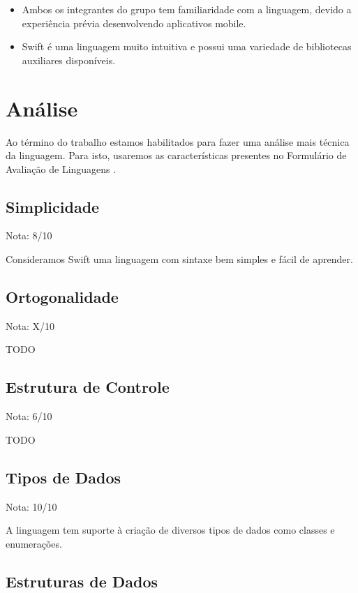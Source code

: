 \documentclass[rel_mlp]{iiufrgs}
\begin{document}
\begin{itemize}[leftmargin=3em]
\setlength{\itemindent}{1em}

    \item Ambos os integrantes do grupo tem familiaridade com a linguagem, devido a experiência prévia desenvolvendo aplicativos mobile.

    \item Swift é uma linguagem muito intuitiva e possui uma variedade de bibliotecas auxiliares disponíveis.

\end{itemize}

\section{Análise}

Ao término do trabalho estamos habilitados para fazer uma análise mais técnica da linguagem. Para isto, usaremos as características presentes no Formulário de Avaliação de Linguagens \cite{catp_01}.

\subsection{Simplicidade}

Nota: 8/10

Consideramos Swift uma linguagem com sintaxe bem simples e fácil de aprender.

\subsection{Ortogonalidade}

Nota: X/10

TODO

\subsection{Estrutura de Controle}

Nota: 6/10

TODO

\subsection{Tipos de Dados}

Nota: 10/10

A linguagem tem suporte à criação de diversos tipos de dados como classes e enumerações.

\subsection{Estruturas de Dados}
\end{document}
